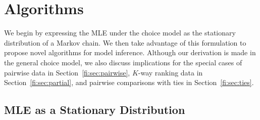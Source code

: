 \section{Algorithms}
\label{fi:sec:algorithms}

We begin by expressing the MLE under the choice model as the stationary distribution of a Markov chain.
We then take advantage of this formulation to propose novel algorithms for model inference.
Although our derivation is made in the general choice model, we also discuss implications for the special cases of pairwise data in Section~\ref{fi:sec:pairwise}, $K$-way ranking data in Section~\ref{fi:sec:partial}, and pairwise comparisons with ties in Section~\ref{fi:sec:ties}.

\subsection{MLE as a Stationary Distribution}

